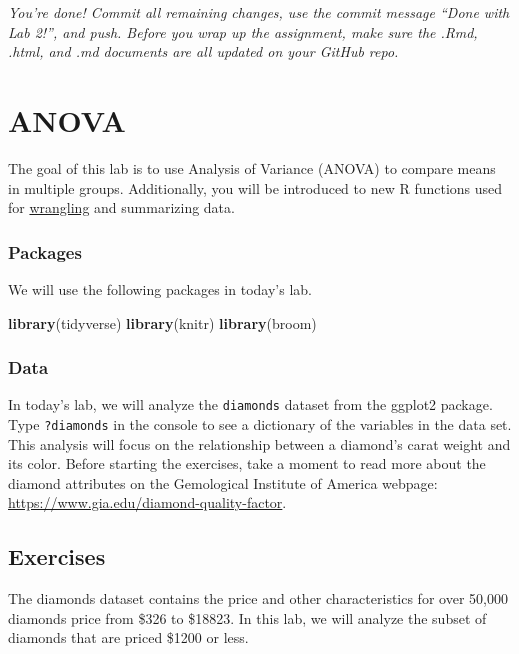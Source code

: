 \documentclass[]{book}
\newenvironment{Shaded}{\begin{snugshade}}{\end{snugshade}}
\newcommand{\KeywordTok}[1]{\textcolor[rgb]{0.13,0.29,0.53}{\textbf{#1}}}
\newcommand{\NormalTok}[1]{#1}
\begin{document}
\emph{You're done! Commit all remaining changes, use the commit message
``Done with Lab 2!'', and push. Before you wrap up the assignment, make
sure the .Rmd, .html, and .md documents are all updated on your GitHub
repo.}

\chapter{ANOVA}\label{anova}

The goal of this lab is to use Analysis of Variance (ANOVA) to compare
means in multiple groups. Additionally, you will be introduced to new R
functions used for
\href{https://en.wikipedia.org/wiki/Data_wrangling}{wrangling} and
summarizing data.

\subsection{Packages}\label{packages-2}

We will use the following packages in today's lab.

\begin{Shaded}
\begin{Highlighting}[]
\KeywordTok{library}\NormalTok{(tidyverse)}
\KeywordTok{library}\NormalTok{(knitr)}
\KeywordTok{library}\NormalTok{(broom)}
\end{Highlighting}
\end{Shaded}

\subsection{Data}\label{data-2}

In today's lab, we will analyze the \texttt{diamonds} dataset from the
ggplot2 package. Type \texttt{?diamonds} in the console to see a
dictionary of the variables in the data set. This analysis will focus on
the relationship between a diamond's carat weight and its color. Before
starting the exercises, take a moment to read more about the diamond
attributes on the Gemological Institute of America webpage:
\url{https://www.gia.edu/diamond-quality-factor}.

\section{Exercises}\label{exercises-2}

The diamonds dataset contains the price and other characteristics for
over 50,000 diamonds price from \$326 to \$18823. In this lab, we will
analyze the subset of diamonds that are priced \$1200 or less.
\end{document}
